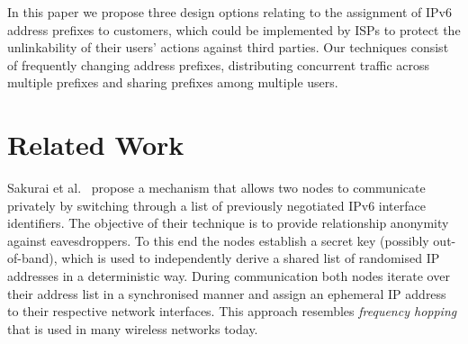 \documentclass{easychair}
\begin{document}
In this paper we propose three design options relating to the assignment of IPv6 address prefixes to customers, which could be implemented by ISPs to protect the unlinkability of their users' actions against third parties. Our techniques consist of frequently changing address prefixes, distributing concurrent traffic across multiple prefixes and sharing prefixes among multiple users.


























































































\section{Related Work}
\label{sec:related}

Sakurai et al.~\cite{Sakurai:07} propose a mechanism that allows two nodes to communicate privately by switching through a list of previously negotiated IPv6 interface identifiers. The objective of their technique is to provide relationship anonymity against eavesdroppers. To this end the nodes establish a secret key (possibly out-of-band), which is used to independently derive a shared list of randomised IP addresses in a deterministic way. During communication both nodes iterate over their address list in a synchronised manner and assign an ephemeral IP address to their respective network interfaces. This approach resembles \emph{frequency hopping} that is used in many wireless networks today.
\end{document}
